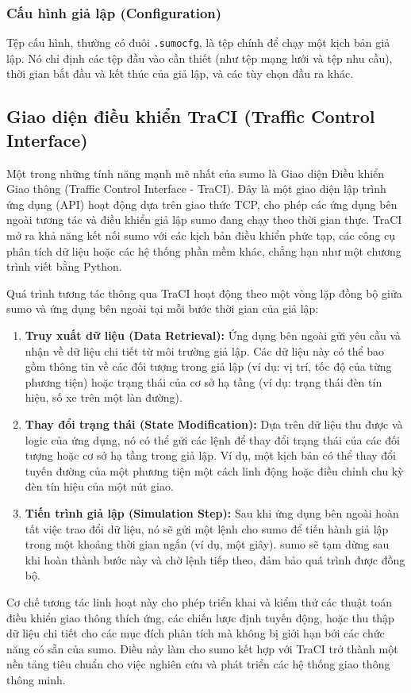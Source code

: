 \subsubsection{Cấu hình giả lập (Configuration)}
Tệp cấu hình, thường có đuôi \texttt{.sumocfg}, là tệp chính để chạy một kịch
bản giả lập. Nó chỉ định các tệp đầu vào cần thiết (như tệp mạng lưới và tệp nhu
cầu), thời gian bắt đầu và kết thúc của giả lập, và các tùy chọn đầu ra khác.

\subsection{Giao diện điều khiển TraCI (Traffic Control Interface)}
Một trong những tính năng mạnh mẽ nhất của \ac{sumo} là Giao diện Điều khiển
Giao thông (Traffic Control Interface - TraCI). Đây là một giao diện lập trình ứng
dụng (API) hoạt động dựa trên giao thức TCP, cho phép các ứng dụng bên ngoài
tương tác và điều khiển giả lập \ac{sumo} đang chạy theo thời gian thực. TraCI
mở ra khả năng kết nối \ac{sumo} với các kịch bản điều khiển phức tạp, các công
cụ phân tích dữ liệu hoặc các hệ thống phần mềm khác, chẳng hạn như một chương trình
viết bằng Python.

Quá trình tương tác thông qua TraCI hoạt động theo một vòng lặp đồng bộ giữa \ac{sumo}
và ứng dụng bên ngoài tại mỗi bước thời gian của giả lập:
\begin{enumerate}
    \item \textbf{Truy xuất dữ liệu (Data Retrieval):} Ứng dụng bên ngoài gửi
        yêu cầu và nhận về dữ liệu chi tiết từ môi trường giả lập. Các dữ liệu này
        có thể bao gồm thông tin về các đối tượng trong giả lập (ví dụ: vị trí,
        tốc độ của từng phương tiện) hoặc trạng thái của cơ sở hạ tầng (ví dụ: trạng
        thái đèn tín hiệu, số xe trên một làn đường).

    \item \textbf{Thay đổi trạng thái (State Modification):} Dựa trên dữ liệu
        thu được và logic của ứng dụng, nó có thể gửi các lệnh để thay đổi trạng
        thái của các đối tượng hoặc cơ sở hạ tầng trong giả lập. Ví dụ, một kịch
        bản có thể thay đổi tuyến đường của một phương tiện một cách linh động hoặc
        điều chỉnh chu kỳ đèn tín hiệu của một nút giao.

    \item \textbf{Tiến trình giả lập (Simulation Step):} Sau khi ứng dụng bên
        ngoài hoàn tất việc trao đổi dữ liệu, nó sẽ gửi một lệnh cho \ac{sumo}
        để tiến hành giả lập trong một khoảng thời gian ngắn (ví dụ, một giây).
        \ac{sumo} sẽ tạm dừng sau khi hoàn thành bước này và chờ lệnh tiếp theo,
        đảm bảo quá trình được đồng bộ.
\end{enumerate}
Cơ chế tương tác linh hoạt này cho phép triển khai và kiểm thử các thuật toán điều
khiển giao thông thích ứng, các chiến lược định tuyến động, hoặc thu thập dữ liệu
chi tiết cho các mục đích phân tích mà không bị giới hạn bởi các chức năng có sẵn
của \ac{sumo}. Điều này làm cho \ac{sumo} kết hợp với TraCI trở thành một nền
tảng tiêu chuẩn cho việc nghiên cứu và phát triển các hệ thống giao thông thông
minh.

